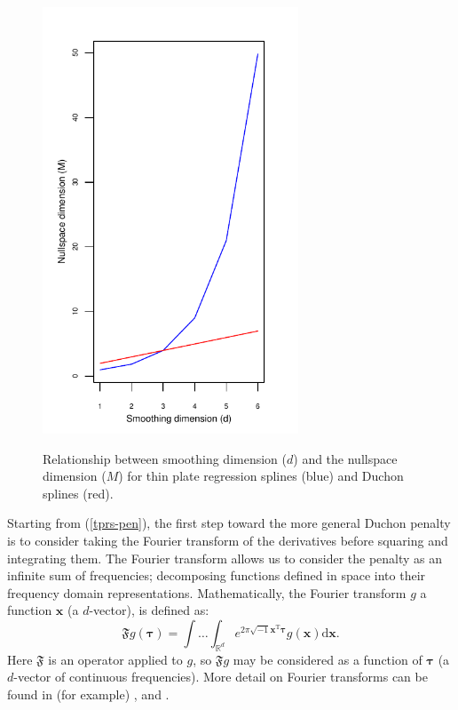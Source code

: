 \begin{figure}
\centering
\includegraphics[width=3in]{gds/figs/nullspace-dim.pdf} \\
\caption{Relationship between smoothing dimension ($d$) and the nullspace dimension ($M$) for thin plate regression splines (blue) and Duchon splines (red).}
\label{nullspace-dim}
\end{figure}

Starting from (\ref{tprs-pen}), the first step toward the more general Duchon penalty is to consider taking the Fourier transform of the derivatives before squaring and integrating them. The Fourier transform allows us to consider the penalty as an infinite sum of frequencies; decomposing functions defined in space into their frequency domain representations. Mathematically, the Fourier transform $g$ a function $\mathbf{x}$ (a $d$-vector), is defined as:
\begin{equation*}
\mathfrak{F} g(\boldsymbol{\tau}) = \int \ldots \int_{\mathbb{R}^d} e^{2 \pi \sqrt{-1} \mathbf{x}^\text{T} \boldsymbol{\tau}} g(\mathbf{x}) \text{d}\mathbf{x}.
\end{equation*}
Here $\mathfrak{F}$ is an operator applied to $g$, so $\mathfrak{F}g$ may be considered as a function of $\boldsymbol{\tau}$ (a $d$-vector of continuous frequencies). More detail on Fourier transforms can be found in (for example) \cite{bracewell}, \cite{chu-ft} and \cite{beerends}. 

